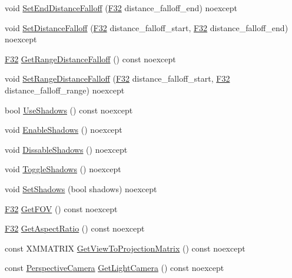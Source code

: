 \begin{DoxyCompactItemize}
void \hyperlink{classmage_1_1_omni_light_a35dac13256d90da9c829653eb68070e9}{Set\+End\+Distance\+Falloff} (\hyperlink{namespacemage_aa97e833b45f06d60a0a9c4fc22ae02c0}{F32} distance\+\_\+falloff\+\_\+end) noexcept
\item 
void \hyperlink{classmage_1_1_omni_light_aa7a5fbf5cbf15199d6e5c6ef28b6ce84}{Set\+Distance\+Falloff} (\hyperlink{namespacemage_aa97e833b45f06d60a0a9c4fc22ae02c0}{F32} distance\+\_\+falloff\+\_\+start, \hyperlink{namespacemage_aa97e833b45f06d60a0a9c4fc22ae02c0}{F32} distance\+\_\+falloff\+\_\+end) noexcept
\item 
\hyperlink{namespacemage_aa97e833b45f06d60a0a9c4fc22ae02c0}{F32} \hyperlink{classmage_1_1_omni_light_adf729b70a53ae97b054f0f2226590612}{Get\+Range\+Distance\+Falloff} () const noexcept
\item 
void \hyperlink{classmage_1_1_omni_light_ad1947b5fcd6c175aa21be1cd19159fb9}{Set\+Range\+Distance\+Falloff} (\hyperlink{namespacemage_aa97e833b45f06d60a0a9c4fc22ae02c0}{F32} distance\+\_\+falloff\+\_\+start, \hyperlink{namespacemage_aa97e833b45f06d60a0a9c4fc22ae02c0}{F32} distance\+\_\+falloff\+\_\+range) noexcept
\item 
bool \hyperlink{classmage_1_1_omni_light_a8d58e7e1b26e54b3d9785ca79213cc4f}{Use\+Shadows} () const noexcept
\item 
void \hyperlink{classmage_1_1_omni_light_ad7c2e780dc83eb63fa44e1475492e192}{Enable\+Shadows} () noexcept
\item 
void \hyperlink{classmage_1_1_omni_light_a2353a53e336ffb55be9949ea6f1d8979}{Dissable\+Shadows} () noexcept
\item 
void \hyperlink{classmage_1_1_omni_light_a19164a13e884bce6fbc80b760c82d243}{Toggle\+Shadows} () noexcept
\item 
void \hyperlink{classmage_1_1_omni_light_a337082a4e6026fe6f98098df063e6660}{Set\+Shadows} (bool shadows) noexcept
\item 
\hyperlink{namespacemage_aa97e833b45f06d60a0a9c4fc22ae02c0}{F32} \hyperlink{classmage_1_1_omni_light_a7a0bd82c0272a7eeeb33a9ede796bae1}{Get\+F\+OV} () const noexcept
\item 
\hyperlink{namespacemage_aa97e833b45f06d60a0a9c4fc22ae02c0}{F32} \hyperlink{classmage_1_1_omni_light_a976a37c3f7c160f0383a93e4f7497eed}{Get\+Aspect\+Ratio} () const noexcept
\item 
const X\+M\+M\+A\+T\+R\+IX \hyperlink{classmage_1_1_omni_light_a3efda1559769189e4693c6e3c570ab4b}{Get\+View\+To\+Projection\+Matrix} () const noexcept
\item 
const \hyperlink{classmage_1_1_perspective_camera}{Perspective\+Camera} \hyperlink{classmage_1_1_omni_light_ac31708d7696a809bb75c75a85b14de80}{Get\+Light\+Camera} () const noexcept
\end{DoxyCompactItemize}
